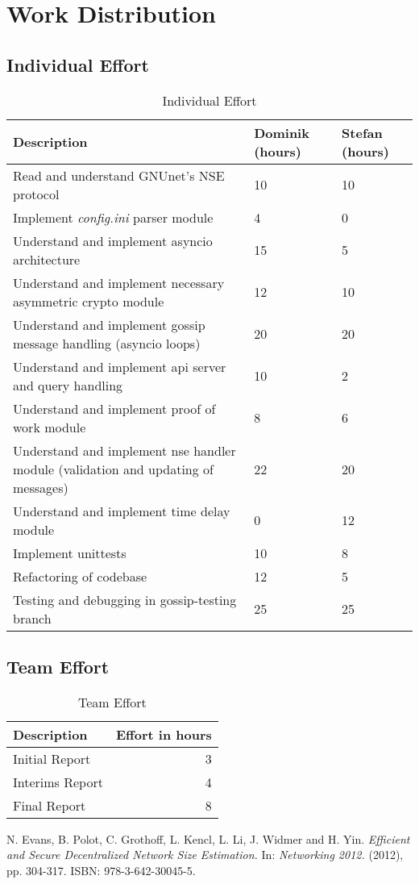 \documentclass[IN,11pt,oneside,openright,english]{article}
\begin{document}
\newpage

\section{Work Distribution}

\subsection{Individual Effort}

\begin{table}[htb]
\centering
\begin{tabular}{p{6.5cm}p{2cm}p{2cm}}
\toprule
\textbf{Description} & \textbf{Dominik (hours)} & \textbf{Stefan (hours)} \\
\midrule
Read and understand GNUnet's NSE protocol & 10 & 10 \\
\midrule
Implement \textit{config.ini} parser module & 4 & 0 \\
\midrule
Understand and implement asyncio architecture & 15 & 5 \\
\midrule
Understand and implement necessary asymmetric crypto module & 12 & 10 \\
\midrule
Understand and implement gossip message handling (asyncio loops) & 20 & 20 \\
\midrule
Understand and implement api server and query handling & 10 & 2 \\
\midrule
Understand and implement proof of work module & 8 & 6 \\
\midrule
Understand and implement nse handler module (validation and updating of messages) & 22 & 20 \\
\midrule
Understand and implement time delay module & 0 & 12 \\
\midrule
Implement unittests & 10 & 8 \\
\midrule
Refactoring of codebase & 12 & 5 \\
\midrule
Testing and debugging in gossip-testing branch & 25 & 25 \\
\bottomrule
\end{tabular}
\caption{Individual Effort}
\end{table}

\newpage 

\subsection{Team Effort}

\begin{table}[htb]
\centering
\begin{tabular}{lr}
\toprule
\textbf{Description} & \textbf{Effort in hours} \\
\midrule
Initial Report & 3 \\
\midrule
Interims Report & 4 \\
\midrule
Final Report & 8 \\
\bottomrule
\end{tabular}
\caption{Team Effort}
\end{table}


\begin{thebibliography}{9}

N. Evans, B. Polot, C. Grothoff, L. Kencl, L. Li, J. Widmer and H. Yin. {\em Efficient and Secure Decentralized Network Size Estimation.} In: {\em Networking 2012.} (2012), pp. 304-317. ISBN: 978-3-642-30045-5.

\end{thebibliography}
\end{document}
